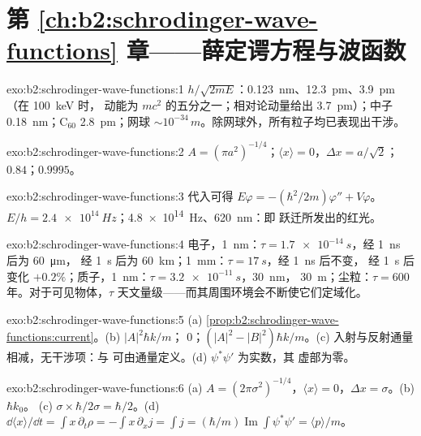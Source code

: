 \section*{第 \ref{ch:b2:schrodinger-wave-functions} 章——薛定谔方程与波函数}

\begin{solution}{exo:b2:schrodinger-wave-functions:1}
$h/\sqrt{2mE}$：\qty{0.123}{nm}、\qty{12.3}{pm}、\qty{3.9}{pm}（在 \qty{100}{keV} 时，
动能为 $mc^2$ 的五分之一；相对论动量给出
\qty{3.7}{pm}）；中子 \qty{0.18}{nm}；C$_{60}$ \qty{2.8}{pm}；网球
$\sim 10^{-34}\,\unit{m}$。除网球外，所有粒子均已表现出干涉。
\end{solution}

\begin{solution}{exo:b2:schrodinger-wave-functions:2}
$A = (\pi a^2)^{-1/4}$；$\langle x\rangle = 0$，$\Delta x = a/\sqrt2$；$0.84$；$0.9995$。
\end{solution}

\begin{solution}{exo:b2:schrodinger-wave-functions:3}
代入可得 $E\varphi = -(\hbar^2/2m)\varphi'' + V\varphi$。$E/h =
\qty{2.4e14}{Hz}$；\qty{4.8e14}{Hz}、\qty{620}{nm}：即
跃迁所发出的红光。
\end{solution}

\begin{solution}{exo:b2:schrodinger-wave-functions:4}
电子，\qty{1}{nm}：$\tau = \qty{1.7e-14}{s}$，经 \qty{1}{ns} 后为 \qty{60}{\micro m}，
经 \qty{1}{s} 后为 \qty{60}{km}；\qty{1}{mm}：$\tau = \qty{17}{s}$，经 \qty{1}{ns} 后不变，
经 \qty{1}{s} 后变化 $+0.2\%$；质子，\qty{1}{nm}：$\tau = \qty{3.2e-11}{s}$，\qty{30}{nm}，
\qty{30}{m}；尘粒：$\tau = 600$ 年。对于可见物体，$\tau$
天文量级——而其周围环境会不断使它们定域化。
\end{solution}

\begin{solution}{exo:b2:schrodinger-wave-functions:5}
(a) \cref{prop:b2:schrodinger-wave-functions:current}。(b) $|A|^2\hbar k/m$；
$0$；$(|A|^2 - |B|^2)\hbar k/m$。(c) 入射与反射通量
相减，无干涉项：与
可由通量定义。(d) $\psi^*\psi'$ 为实数，其
虚部为零。
\end{solution}

\begin{solution}{exo:b2:schrodinger-wave-functions:6}
(a) $A = (2\pi\sigma^2)^{-1/4}$，$\langle x\rangle = 0$，$\Delta x = \sigma$。(b) $\hbar k_0$。
(c) $\sigma \times \hbar/2\sigma = \hbar/2$。(d) $\dd\langle x\rangle/\dd t = \int x\,
\partial_t\rho = -\int x\,\partial_xj = \int j = (\hbar/m)\operatorname{Im}\int\psi^*
\psi' = \langle p\rangle/m$。
\end{solution}

